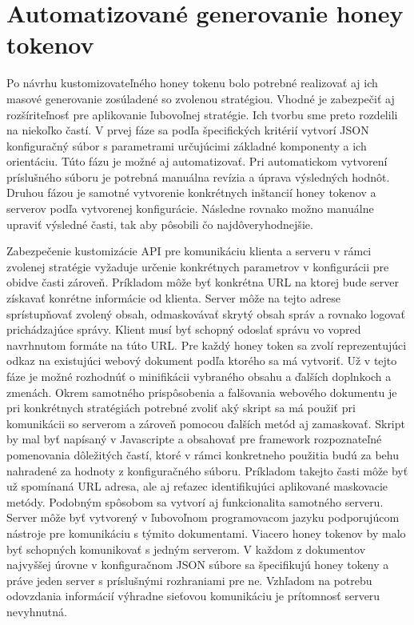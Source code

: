 \documentclass[conference, 11pt,slovak,a4paper,twoside]{IEEEtran}
\begin{document}
\section{Automatizované generovanie honey tokenov}

Po návrhu kustomizovateľného honey tokenu bolo potrebné realizovať aj ich masové generovanie zosúladené so zvolenou stratégiou. Vhodné je zabezpečiť aj rozšíriteľnosť pre aplikovanie ľubovoľnej stratégie. Ich tvorbu sme preto rozdelili na niekoľko častí. V prvej fáze sa podľa špecifických kritérií vytvorí JSON konfiguračný súbor s parametrami určujúcimi základné komponenty a ich orientáciu. Túto fázu je možné aj automatizovať. Pri automatickom vytvorení príslušného súboru je potrebná manuálna revízia a úprava výsledných hodnôt. Druhou fázou je samotné vytvorenie konkrétnych inštancií honey tokenov a serverov podľa vytvorenej konfigurácie. Následne rovnako možno manuálne upraviť výsledné časti, tak aby pôsobili čo najdôveryhodnejšie.

Zabezpečenie kustomizácie API pre komunikáciu klienta a serveru v rámci zvolenej stratégie vyžaduje určenie konkrétnych parametrov v konfigurácii pre obidve časti zároveň. Príkladom môže byť konkrétna URL na ktorej bude server získavať konrétne informácie od klienta. Server môže na tejto adrese sprístupňovať zvolený obsah, odmaskovávať skrytý obsah správ a rovnako logovať prichádzajúce správy. Klient musí byť schopný odoslať správu vo vopred navrhnutom formáte na túto URL. Pre každý honey token sa zvolí reprezentujúci odkaz na existujúci webový dokument podľa ktorého sa má vytvoriť. Už v tejto fáze je možné rozhodnúť o minifikácii vybraného obsahu a ďalších doplnkoch a zmenách. Okrem samotného prispôsobenia a falšovania webového dokumentu je pri konkrétnych stratégiách potrebné zvoliť aký skript sa má použiť pri komunikácii so serverom a zároveň pomocou ďalších metód aj zamaskovať. Skript by mal byť napísaný v Javascripte a obsahovať pre framework rozpoznateľné pomenovania dôležitých častí, ktoré v rámci konkretneho použitia budú za behu nahradené za hodnoty z konfiguračného súboru. Príkladom takejto časti môže byť už spomínaná URL adresa, ale aj reťazec identifikujúci aplikované maskovacie metódy. Podobným spôsobom sa vytvorí aj funkcionalita samotného serveru. Server môže byť vytvorený v ľubovoľnom programovacom jazyku podporujúcom nástroje pre komunikáciu s týmito dokumentami. Viacero honey tokenov by malo byť schopných komunikovať s jedným serverom. V každom z dokumentov najvyššej úrovne v konfiguračnom JSON súbore sa špecifikujú honey tokeny a práve jeden server s príslušnými rozhraniami pre ne. Vzhľadom na potrebu odovzdania informácií výhradne sieťovou komunikáciu je prítomnosť serveru nevyhnutná. 
\end{document}
